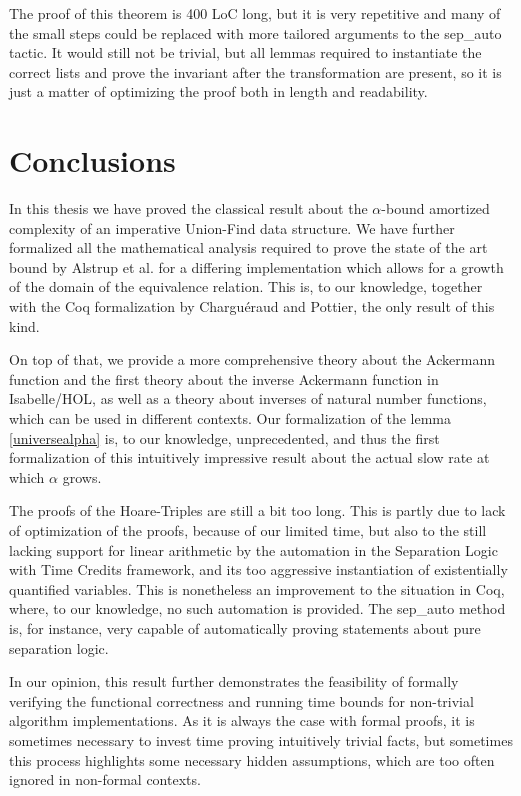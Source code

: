 \documentclass[headsepline,footsepline,footinclude=false,oneside,fontsize=11pt,paper=a4,listof=totoc,bibliography=totoc]{scrbook} %
\begin{document}
The proof of this theorem is 400 LoC long, but it is very repetitive and many of the small steps could be replaced with more tailored arguments to the sep\_auto tactic. It would still not be trivial, but all lemmas required to instantiate the correct lists and prove the invariant after the transformation are present, so it is just a matter of optimizing the proof both in length and readability.



\chapter{Conclusions}



In this thesis we have proved the classical result about the $\alpha$-bound amortized complexity of an imperative Union-Find data structure. We have further formalized all the mathematical analysis required to prove the state of the art bound by Alstrup et al. for a differing implementation which allows for a growth of the domain of the equivalence relation. This is, to our knowledge, together with the Coq formalization by Charguéraud and Pottier, the only result of this kind. 

On top of that, we provide a more comprehensive theory about the Ackermann function and the first theory about the inverse Ackermann function in Isabelle/HOL, as well as a theory about inverses of natural number functions, which can be used in different contexts. Our formalization of the lemma \ref{universealpha} is, to our knowledge, unprecedented, and thus the first formalization of this intuitively impressive result about the actual slow rate at which $\alpha$ grows.

The proofs of the Hoare-Triples are still a bit too long. This is partly due to lack of optimization of the proofs, because of our limited time, but also to the still lacking support for linear arithmetic by the automation in the Separation Logic with Time Credits framework, and its too aggressive instantiation of existentially quantified variables. This is nonetheless an improvement to the situation in Coq, where, to our knowledge, no such automation is provided. The sep\_auto method is, for instance, very capable of automatically proving statements about pure separation logic.

In our opinion, this result further demonstrates the feasibility of formally verifying the functional correctness and running time bounds for non-trivial algorithm implementations. As it is always the case with formal proofs, it is sometimes necessary to invest time proving intuitively trivial facts, but sometimes this process highlights some necessary hidden assumptions, which are too often ignored in non-formal contexts.



\appendix{}

\lstlistoflistings{}
\listoffigures{}
\printbibliography{}
\end{document}
